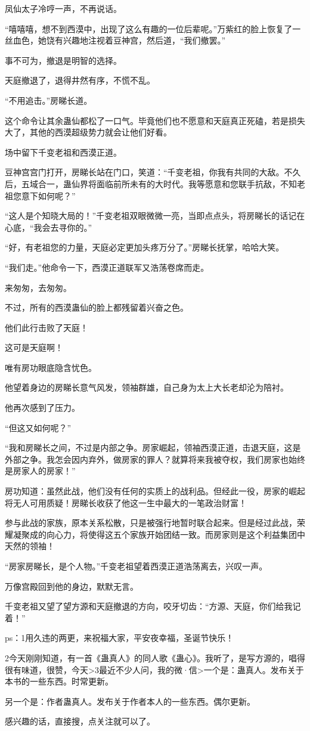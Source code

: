 \begin{this_body}
凤仙太子冷哼一声，不再说话。

“嘻嘻嘻，想不到西漠中，出现了这么有趣的一位后辈呢。”万紫红的脸上恢复了一丝血色，她饶有兴趣地注视着豆神宫，然后道，“我们撤罢。”

事不可为，撤退是明智的选择。

天庭撤退了，退得井然有序，不慌不乱。

“不用追击。”房睇长道。

这个命令让其余蛊仙都松了一口气。毕竟他们也不愿意和天庭真正死磕，若是损失大了，其他的西漠超级势力就会让他们好看。

场中留下千变老祖和西漠正道。

豆神宫宫门打开，房睇长站在门口，笑道：“千变老祖，你我有共同的大敌。不久后，五域合一，蛊仙界将面临前所未有的大时代。我等愿意和您联手抗敌，不知老祖您意下如何呢？”

“这人是个知晓大局的！”千变老祖双眼微微一亮，当即点点头，将房睇长的话记在心底，“我会去寻你的。”

“好，有老祖您的力量，天庭必定更加头疼万分了。”房睇长抚掌，哈哈大笑。

“我们走。”他命令一下，西漠正道联军又浩荡卷席而走。

来匆匆，去匆匆。

不过，所有的西漠蛊仙的脸上都残留着兴奋之色。

他们此行击败了天庭！

这可是天庭啊！

唯有房功眼底隐含忧色。

他望着身边的房睇长意气风发，领袖群雄，自己身为太上大长老却沦为陪衬。

他再次感到了压力。

“但这又如何呢？”

“我和房睇长之间，不过是内部之争。房家崛起，领袖西漠正道，击退天庭，这是外部之争。我怎会因内弃外，做房家的罪人？就算将来我被夺权，我们房家也始终是房家人的房家！”

房功知道：虽然此战，他们没有任何的实质上的战利品。但经此一役，房家的崛起将无人可用质疑！房睇长收获了他这一生中最大的一笔政治财富！

参与此战的家族，原本关系松散，只是被强行地暂时联合起来。但是经过此战，荣耀凝聚成的向心力，将使得这五个家族开始团结一致。而房家则是这个利益集团中天然的领袖！

“房家房睇长，是个人物。”千变老祖望着西漠正道浩荡离去，兴叹一声。

万像宫殿回到他的身边，默默无言。

千变老祖又望了望方源和天庭撤退的方向，咬牙切齿：“方源、天庭，你们给我记着！”

ps：1用久违的两更，来祝福大家，平安夜幸福，圣诞节快乐！

2今天刚刚知道，有一首《蛊真人》的同人歌《蛊心》。我听了，是写方源的，唱得很有味道，很赞，今天>3最近不少人问，我的微·信>一个是：蛊真人。发布关于本书的一些东西。时常更新。

另一个是：作者蛊真人。发布关于作者本人的一些东西。偶尔更新。

感兴趣的话，直接搜，点关注就可以了。

\end{this_body}


